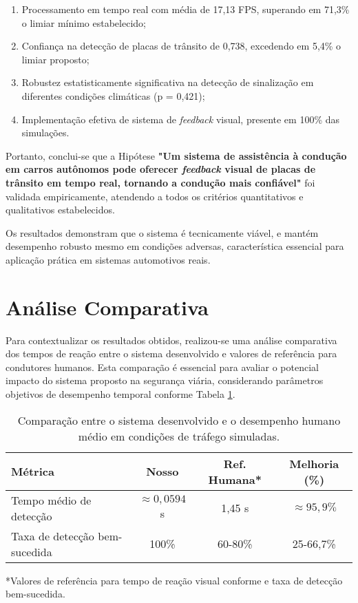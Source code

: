 \begin{enumerate}
    \item Processamento em tempo real com média de 17,13 FPS, superando em 71,3\% o limiar mínimo estabelecido;
    \item Confiança na detecção de placas de trânsito de 0,738, excedendo em 5,4\% o limiar proposto;
    \item Robustez estatisticamente significativa na detecção de sinalização em diferentes condições climáticas (p = 0,421);
    \item Implementação efetiva de sistema de \textit{feedback} visual, presente em 100\% das simulações.
\end{enumerate}

Portanto, conclui-se que a Hipótese \textbf{"Um sistema de assistência à condução em carros autônomos pode oferecer \textit{feedback} visual de placas de trânsito em tempo real, tornando a condução mais confiável"} foi validada empiricamente, atendendo a todos os critérios quantitativos e qualitativos estabelecidos.

Os resultados demonstram que o sistema é tecnicamente viável, e mantém desempenho robusto mesmo em condições adversas, característica essencial para aplicação prática em sistemas automotivos reais.

\section{Análise Comparativa} \label{sec:analise_comparativa}

Para contextualizar os resultados obtidos, realizou-se uma análise comparativa dos tempos de reação entre o sistema desenvolvido e valores de referência para condutores humanos. Esta comparação é essencial para avaliar o potencial impacto do sistema proposto na segurança viária, considerando parâmetros objetivos de desempenho temporal conforme Tabela \ref{tab:comparacao_humano}.

\begin{table}[H]
\centering
\begin{tabular}{|l|c|c|c|}
\hline
\textbf{Métrica} & \textbf{Nosso} & \textbf{Ref. Humana*} & \textbf{Melhoria (\%)} \\
\hline
Tempo médio de detecção  & $\approx0,0594$ s & 1,45 s & $\approx95,9\%$ \\
\hline
Taxa de detecção bem-sucedida & 100\% & 60-80\% & 25-66,7\% \\
\hline
\end{tabular}
\caption{Comparação entre o sistema desenvolvido e o desempenho humano médio em condições de tráfego simuladas.}
\label{tab:comparacao_humano}
\small{*Valores de referência para tempo de reação visual conforme  e taxa de detecção bem-sucedida.}
\end{table}

